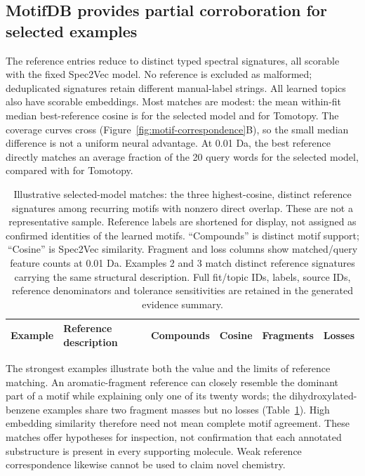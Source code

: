 \documentclass[10pt,a4paper]{article}
\begin{document}
\subsection{MotifDB provides partial corroboration for selected examples}

The \ChemRawReferences{} reference entries reduce to
\ChemUniqueReferences{} distinct typed spectral signatures, all scorable
with the fixed Spec2Vec model. No reference is excluded as malformed;
\ChemConflictingReferences{} deduplicated signatures retain different
manual-label strings. All learned topics also have scorable embeddings.
Most matches are modest: the mean within-fit median best-reference cosine
is \ChemSelectedReferenceMedian{} for the selected model and
\ChemLDAReferenceMedian{} for Tomotopy. The coverage curves cross
(Figure~\ref{fig:motif-correspondence}B), so the small median difference is
not a uniform neural advantage. At 0.01 Da, the best reference directly
matches an average fraction \ChemSelectedReferenceOverlap{} of the 20
query words for the selected model, compared with
\ChemLDAReferenceOverlap{} for Tomotopy.

\begin{table}[H]
\centering\small
\caption{Illustrative selected-model matches: the three highest-cosine,
distinct reference signatures among recurring motifs with nonzero direct
overlap. These are not a representative sample. Reference labels are
shortened for display, not assigned as confirmed identities of the learned
motifs. ``Compounds'' is distinct motif support; ``Cosine'' is Spec2Vec
similarity. Fragment and loss columns show matched/query feature counts
at 0.01 Da. Examples 2 and 3 match distinct reference signatures carrying
the same structural description. Full fit/topic IDs, labels, source IDs,
reference denominators and tolerance sensitivities are retained in the
generated evidence summary.}
\label{tab:reference-examples}
\setlength{\tabcolsep}{4pt}
\begin{tabularx}{\linewidth}{@{}rXrrrr@{}}
\toprule
Example & Reference description & Compounds & Cosine & Fragments & Losses \\
\midrule

\end{tabularx}
\end{table}

The strongest examples illustrate both the value and the limits of
reference matching. An aromatic-fragment reference can closely resemble
the dominant part of a motif while explaining only one of its twenty words;
the dihydroxylated-benzene examples share two fragment masses but no losses
(Table~\ref{tab:reference-examples}). High embedding similarity therefore
need not mean complete motif agreement. These matches offer hypotheses
for inspection, not confirmation that each annotated substructure is
present in every supporting molecule. Weak reference correspondence likewise
cannot be used to claim novel chemistry.
\end{document}
